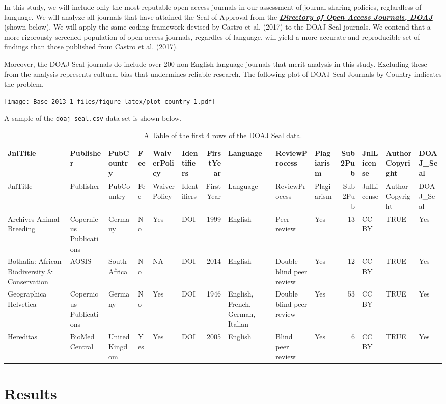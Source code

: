 \documentclass[]{article}
\begin{document}
In this study, we will include only the most reputable open access
journals in our assessment of journal sharing policies, reglardless of
language. We will analyze all journals that have attained the Seal of
Approval from the \href{http://doaj.org}{\emph{\textbf{Directory of Open
Access Journals, DOAJ}}} (shown below). We will apply the same coding
framework devised by Castro et al. (2017) to the DOAJ Seal journals. We
contend that a more rigorously screened population of open access
journals, regardles of language, will yield a more accurate and
reproducible set of findings than those published from Castro et al.
(2017).

Moreover, the DOAJ Seal journals do include over 200 non-English
language journals that merit analysis in this study. Excluding these
from the analysis represents cultural bias that undermines reliable
research. The following plot of DOAJ Seal Journals by Country indicates
the problem.

\texttt{[image: Base\_2013\_1\_files/figure-latex/plot\_country-1.pdf]}

A sample of the \texttt{doaj\_seal.csv} data set is shown below.

\begin{longtable}[]{@{}llllllrlllrlll@{}}
\caption{A Table of the first 4 rows of the DOAJ Seal
data.}\tabularnewline
\toprule
JnlTitle & Publisher & PubCountry & Fee & WaiverPolicy & Identifiers &
FirstYear & Language & ReviewProcess & Plagiarism & Sub2Pub & JnlLicense
& AuthorCopyright & DOAJ\_Seal\tabularnewline
\midrule
\endfirsthead
\toprule
JnlTitle & Publisher & PubCountry & Fee & WaiverPolicy & Identifiers &
FirstYear & Language & ReviewProcess & Plagiarism & Sub2Pub & JnlLicense
& AuthorCopyright & DOAJ\_Seal\tabularnewline
\midrule
\endhead
Archives Animal Breeding & Copernicus Publications & Germany & No & Yes
& DOI & 1999 & English & Peer review & Yes & 13 & CC BY & TRUE &
Yes\tabularnewline
Bothalia: African Biodiversity \& Conservation & AOSIS & South Africa &
No & NA & DOI & 2014 & English & Double blind peer review & Yes & 12 &
CC BY & TRUE & Yes\tabularnewline
Geographica Helvetica & Copernicus Publications & Germany & No & Yes &
DOI & 1946 & English, French, German, Italian & Double blind peer review
& Yes & 53 & CC BY & TRUE & Yes\tabularnewline
Hereditas & BioMed Central & United Kingdom & Yes & Yes & DOI & 2005 &
English & Blind peer review & Yes & 6 & CC BY & TRUE &
Yes\tabularnewline
\bottomrule
\end{longtable}

\hypertarget{results}{%
\section{Results}\label{results}}
\end{document}
